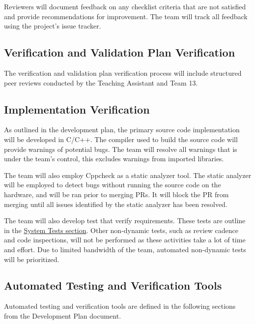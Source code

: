 \documentclass[12pt, titlepage]{article}
\begin{document}
Reviewers will document feedback on any checklist criteria that are not
satisfied and provide recommendations for improvement. The team will track all
feedback using the project's issue tracker.

\subsection{Verification and Validation Plan Verification}
\label{sec:vnv_plan_verification}

The verification and validation plan verification process will include
structured peer reviews conducted by the Teaching Assistant and Team 13.

\subsection{Implementation Verification}\label{sec:implementation_verification}

As outlined in the development plan, the primary source code implementation will
be developed in C/C++. The compiler used to build the source code will provide
warnings of potential bugs. The team will resolve all warnings that is under the
team's control, this excludes warnings from imported libraries. \newline

The team will also employ Cppcheck \cite{Cppcheck} as a
static analyzer tool. The static analyzer will be employed to detect bugs
without running the source code on the hardware, and will be ran prior to
merging PRs. It will block the PR from merging until all issues identified by
the static analyzer has been resolved.

The team will also develop test that verify requirements. These tests are
outline in the \hyperref[sec:system_tests]{System Tests section}. Other
non-dynamic tests, such as review cadence and code inspections, will not be
performed as these activities take a lot of time and effort. Due to limited
bandwidth of the team, automated non-dynamic tests will be prioritized. 

\subsection{Automated Testing and Verification Tools}
\label{sec:testing_tools}

Automated testing and verification tools are defined in the following sections
from the Development Plan document.
\end{document}
